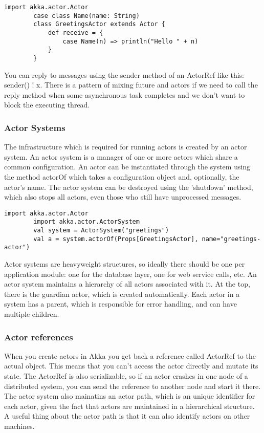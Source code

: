 \documentclass[12pt]{article}
\begin{document}
	\begin{lstlisting}[style=myScalastyle, caption={Simple actor implementation}, label={greetingActor}]
		import akka.actor.Actor 
		case class Name(name: String)
		class GreetingsActor extends Actor {
			def receive = {
				case Name(n) => println("Hello " + n) 
			}
		}
	\end{lstlisting}

	You can reply to messages using the sender method of an ActorRef\cite{AkkaDocs} like this: sender() ! x.
	There is a pattern of mixing future and actors if we need to call the reply method when 
	some asynchronous task completes and we don't want to block the executing thread.

	\subsubsection{Actor Systems}
	The infrastructure which is required for running actors is created by an 
	actor system\cite{ScalaInAction}.
	An actor system is a manager of one or more actors which share a common configuration. An actor 
	can be instantiated through the system using the method actorOf which takes a configuration object 
	and, optionally, the actor's name. The actor system can be destroyed using the 'shutdown' method,
	which also stops all actors, even those who still have unprocessed messages. 

	\begin{lstlisting}[style=myScalastyle, caption={Actor system demo}, label={actorSystem}]
		import akka.actor.Actor
		import akka.actor.ActorSystem 
		val system = ActorSystem("greetings")
		val a = system.actorOf(Props[GreetingsActor], name="greetings-actor")
	\end{lstlisting}

	Actor systems are heavyweight structures, so ideally there should be one per application 
	module: one for the database layer, one for web service calls, etc\cite{AkkaDocs}. An actor system maintains 
	a hierarchy of all actors associated with it. At the top, there is the guardian actor, which is 
	created automatically. Each actor in a system has a parent, which is responsible for error 
	handling, and can have multiple children.

	\subsubsection{Actor references}
	When you create actors in Akka you get back a reference called ActorRef to the actual 
	object\cite{ScalaInAction}. This means that you can't access the actor directly and mutate its state. The ActorRef
	is also serializable, so if an actor crashes in one node of a distributed system, you 
	can send the reference to another node and start it there. The actor system also mainatins an actor 
	path, which is an unique identifier for each actor, given the fact that actors are maintained 
	in a hierarchical structure. A useful thing about the actor path is that it can also identify 
	actors on other machines.
\end{document}
